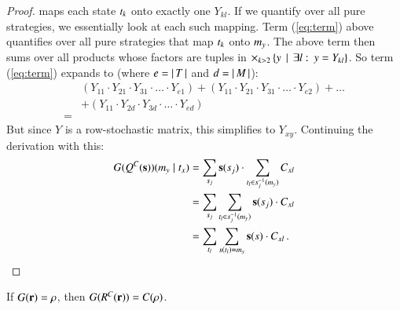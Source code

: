 \documentclass[fleqn,reqno,10pt]{article}
\renewcommand{\Smixed}{\ensuremath{\mathrm{\mathbf{s}}}}
\renewcommand{\Rmixed}{\ensuremath{\mathrm{\mathbf{r}}}}
\begin{document}
\begin{proof}
  maps each state $t_k$ onto exactly one $Y_{kl}$. If we quantify
  over all pure strategies, we essentially look at each such
  mapping. Term (\ref{eq:term}) above quantifies over all pure
  strategies that map $t_k$ onto $m_y$. The above term then
  sums over all products whose factors are tuples in $\times_{k>2}
  \left\{y \thinspace \mid \thinspace \exists l \thinspace \colon \thinspace y = Y_{kl}\right\}$. So term
  (\ref{eq:term}) expands to (where $e = \left \lvert \, T \, \right\rvert$ and $d=\left \lvert \, M \, \right\rvert$):
  \begin{align*}
    & (Y_{11} \cdot Y_{21} \cdot Y_{31} \cdot \ldots \cdot Y_{e1}) +
    (Y_{11} \cdot Y_{21} \cdot Y_{31} \cdot \ldots \cdot Y_{e2}) + 
    \dots \\
    & + (Y_{11} \cdot Y_{2d} \cdot
    Y_{3d} \cdot \ldots \cdot
    Y_{ed})\\
    = &    
  \end{align*}
  But since $Y$ is a row-stochastic matrix, this simplifies to
  $Y_{xy}$. Continuing the derivation with this:
  \begin{align*}
    G(Q^C(\Smixed))(\messg_y \probbar \state_x) 
    & = \sum_{\Spure_j} \Smixed(\Spure_j) \cdot
    \sum_{\state_l \in \Spure_j^{-1}(\messg_y)} C_{xl} \\
    & = \sum_{\Spure_j} \sum_{\state_l \in \Spure_j^{-1}(\messg_y)} \Smixed(\Spure_j) \cdot
     C_{xl} \\
     & = \sum_{\state_l}
    \sum_{\Spure(\state_l) = \messg_y} \Smixed(\Spure) \cdot C_{xl}\,.
  \end{align*}

\end{proof}

\begin{theorem}
  If $G(\Rmixed) = \Rstrat$, then $G(R^C(\Rmixed)) = C(\Rstrat)$.
\end{theorem}
\end{document}
